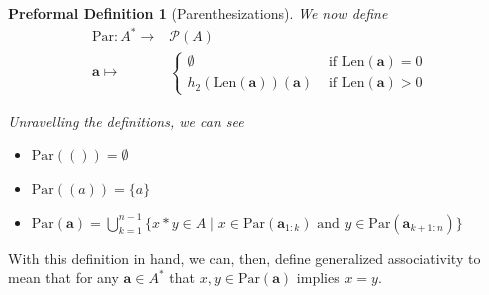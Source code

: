 \documentclass[oneside, 12pt]{book}
\theoremstyle{break}
\newtheorem{preformal definition}[definition]{Preformal Definition}
\newtheorem{preformal theorem}[theorem]{Preformal Theorem}
\newcommand{\bv}[1]{\boldsymbol{#1}}
\newcommand{\mc}[1]{\mathcal{#1}}
\begin{document}
\begin{preformal definition}[Parenthesizations]
				We now define 
				\begin{align*}
					\text{Par}: A^*\to& \mc{P}(A)\\
					\bv{a} \mapsto& \begin{cases} \emptyset &\text{ if } \text{Len}(\bv{a}) = 0\\
						h_2(\text{Len}(\bv{a}))(\bv{a}) &\text{ if } \text{Len}(\bv{a}) > 0
						\end{cases}
				\end{align*}
	
				Unravelling the definitions, we can see
				\begin{itemize}
					\item{$\text{Par}(()) = \emptyset$}
					\item{$\text{Par}((a)) = \{a\}$}
					\item{$\text{Par}(\bv{a}) = \bigcup_{k=1}^{n-1}\{x\ast y \in A \mid x \in \text{Par}(\bv{a}_{1:k}) \text{ and } y \in \text{Par}(\bv{a}_{k+1:n})\}$}
				\end{itemize}
			\end{preformal definition}
			
			With this definition in hand, we can, then, define generalized associativity to mean that for any $\bv{a} \in A^*$ that $x, y \in \text{Par}(\bv{a})$ implies $x=y$.
	
\end{document}
